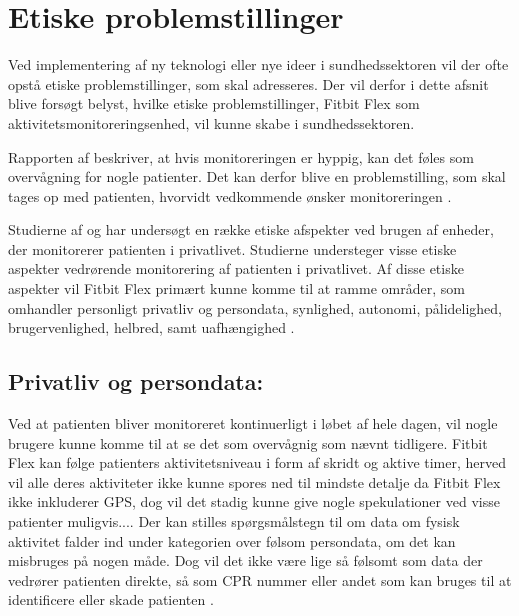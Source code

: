 \section{Etiske problemstillinger}

Ved implementering af ny teknologi eller nye ideer i sundhedssektoren vil der ofte opstå etiske problemstillinger, som skal adresseres. Der vil derfor i dette afsnit blive forsøgt belyst, hvilke etiske problemstillinger, Fitbit Flex som aktivitetsmonitoreringsenhed, vil kunne skabe i sundhedssektoren.

Rapporten af \citeauthor{patienthome2015} beskriver, at hvis monitoreringen er hyppig, kan det føles som overvågning for nogle patienter. Det kan derfor blive en problemstilling, som skal tages op med patienten, hvorvidt vedkommende ønsker monitoreringen \citep{patienthome2015, SundhedsstyrelsenPatientersRetsstilling2016}.

Studierne af \citeauthor{Mittelstand2011} og \citeauthor{Nordgren2013} har undersøgt en række etiske afspekter ved brugen af enheder, der monitorerer patienten i privatlivet. Studierne understeger visse etiske aspekter vedrørende monitorering af patienten i privatlivet.%
Af disse etiske aspekter vil Fitbit Flex primært kunne komme til at ramme områder, som omhandler personligt privatliv og persondata, synlighed, autonomi, pålidelighed, brugervenlighed, helbred, samt uafhængighed \citep{Mittelstand2011, Nordgren2013}.


\subsection{Privatliv og persondata:}

Ved at patienten bliver monitoreret kontinuerligt i løbet af hele dagen, vil nogle brugere kunne komme til at se det som overvågnig som nævnt tidligere. Fitbit Flex kan følge patienters aktivitetsniveau i form af skridt og aktive timer, herved vil alle deres aktiviteter ikke kunne spores ned til mindste detalje da Fitbit Flex ikke inkluderer GPS, dog vil det stadig kunne give nogle spekulationer ved visse patienter muligvis....
Der kan stilles spørgsmålstegn til om data om fysisk aktivitet falder ind under kategorien over følsom persondata, om det kan misbruges på nogen måde. Dog vil det ikke være lige så følsomt som data der vedrører patienten direkte, så som CPR nummer eller andet som kan bruges til at identificere eller skade patienten \citep{Mittelstand2011}.

